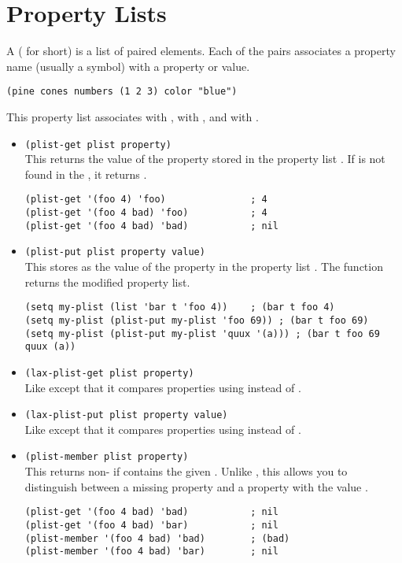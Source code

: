 \section{Property Lists}
\label{sec:property-lists}


A  ( for short) is a list of paired elements.
Each of the pairs associates a property name (usually a symbol) with a property or value.


\begin{lstlisting}
(pine cones numbers (1 2 3) color "blue")
\end{lstlisting}
This property list associates  with ,  with , and  with .


\begin{itemize}
\item \lstinline|(plist-get plist property)|\\
  This returns the value of the  property stored in the property list .
  If  is not found in the , it returns .
\begin{lstlisting}
(plist-get '(foo 4) 'foo)               ; 4
(plist-get '(foo 4 bad) 'foo)           ; 4
(plist-get '(foo 4 bad) 'bad)           ; nil
\end{lstlisting}
\item \lstinline|(plist-put plist property value)|\\
  This stores  as the value of the  property in the property list .
  The function returns the modified property list.
\begin{lstlisting}
(setq my-plist (list 'bar t 'foo 4))    ; (bar t foo 4)
(setq my-plist (plist-put my-plist 'foo 69)) ; (bar t foo 69)
(setq my-plist (plist-put my-plist 'quux '(a))) ; (bar t foo 69 quux (a))
\end{lstlisting}
\item \lstinline|(lax-plist-get plist property)|\\
  Like  except that it compares properties using  instead of .
\item \lstinline|(lax-plist-put plist property value)|\\
  Like  except that it compares properties using  instead of .  
\item \lstinline|(plist-member plist property)|\\
  This returns non- if  contains the given .
  Unlike , this allows you to distinguish between a missing property and a property with the value .
\begin{lstlisting}
(plist-get '(foo 4 bad) 'bad)           ; nil
(plist-get '(foo 4 bad) 'bar)           ; nil
(plist-member '(foo 4 bad) 'bad)        ; (bad)
(plist-member '(foo 4 bad) 'bar)        ; nil
\end{lstlisting}
\end{itemize}

